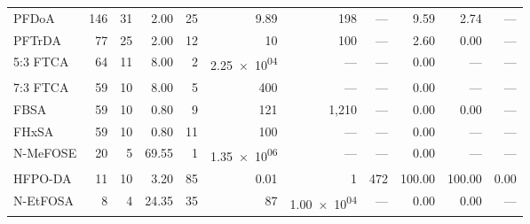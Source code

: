 \begin{table}[p]
\begin{tabular}{@{}l r r r r r r r r r r@{}}
PFDoA & 146 & 31 & 2.00 & 25 & 9.89 & 198 & --- & 9.59 & 2.74 & --- \\
PFTrDA & 77 & 25 & 2.00 & 12 & 10 & 100 & --- & 2.60 & 0.00 & --- \\
5:3 FTCA & 64 & 11 & 8.00 & 2 & \num{2.25e+04} & --- & --- & 0.00 & --- & --- \\
7:3 FTCA & 59 & 10 & 8.00 & 5 & 400 & --- & --- & 0.00 & --- & --- \\
FBSA & 59 & 10 & 0.80 & 9 & 121 & 1,210 & --- & 0.00 & 0.00 & --- \\
FHxSA & 59 & 10 & 0.80 & 11 & 100 & --- & --- & 0.00 & --- & --- \\
N-MeFOSE & 20 & 5 & 69.55 & 1 & \num{1.35e+06} & --- & --- & 0.00 & --- & --- \\
HFPO-DA & 11 & 10 & 3.20 & 85 & 0.01 & 1 & 472 & 100.00 & 100.00 & 0.00 \\
N-EtFOSA & 8 & 4 & 24.35 & 35 & 87 & \num{1.00e+04} & --- & 0.00 & 0.00 & --- \\
\bottomrule
\end{tabular}
\end{table}